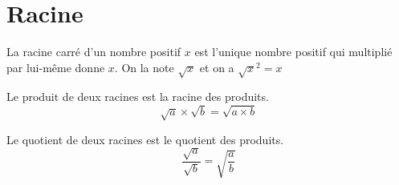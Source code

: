 \section{Racine}

{   La racine carré d'un nombre positif $x$ est l'unique nombre positif qui multiplié par lui-même donne $x$. On la note $\sqrt{x}$ et on a $\sqrt{x}^2=x$
}

{
    Le produit de deux racines est la racine des produits. $$\sqrt{a}\times\sqrt{b}=\sqrt{a\times b}$$
}

{
    Le quotient de deux racines est le quotient des produits. $$\dfrac{\sqrt{a}}{\sqrt{b}}=\sqrt{\dfrac{a}{b}}$$
}